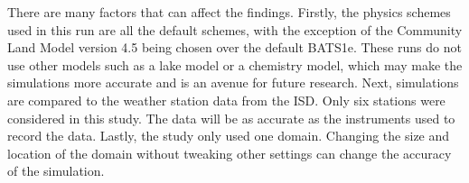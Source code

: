	There are many factors that can affect the findings. 
	Firstly, the physics schemes used in this run are all the default schemes, with the exception of the Community Land Model version 4.5 being chosen over the default BATS1e. 
	These runs do not use other models such as a lake model or a chemistry model, which may make the simulations more accurate and is an avenue for future research.
	Next, simulations are compared to the weather station data from the ISD.
	Only six stations were considered in this study.
	The data will be as accurate as the instruments used to record the data.
	Lastly, the study only used one domain.
	Changing the size and location of the domain without tweaking other settings can change the accuracy of the simulation.